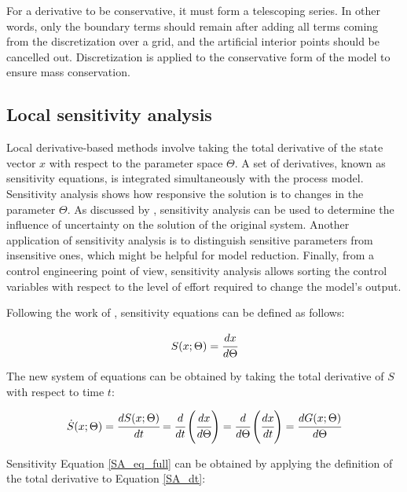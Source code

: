 \documentclass[a4paper,fleqn]{cas-dc}
\begin{document}
	For a derivative to be conservative, it must form a telescoping series. In other words, only the boundary terms should remain after adding all terms coming from the discretization over a grid, and the artificial interior points should be cancelled out. Discretization is applied to the conservative form of the model to ensure mass conservation.
	
	\subsection{Local sensitivity analysis} \label{CH: Sensitivity_Analysis}
	
	Local derivative-based methods involve taking the total derivative of the state vector $x$ with respect to the parameter space $\Theta$. A set of derivatives, known as sensitivity equations, is integrated simultaneously with the process model. Sensitivity analysis shows how responsive the solution is to changes in the parameter $\Theta$. As discussed by \citet{Dickinson1976}, sensitivity analysis can be used to determine the influence of uncertainty on the solution of the original system. Another application of sensitivity analysis is to distinguish sensitive parameters from insensitive ones, which might be helpful for model reduction. Finally, from a control engineering point of view, sensitivity analysis allows sorting the control variables with respect to the level of effort required to change the model's output.
	
	Following the work of \citet{Maly1996}, sensitivity equations can be defined as follows:
	
	{\footnotesize
		\begin{equation}
			\label{SA_def}
			S(x;\Theta) = \cfrac{dx}{d\Theta}
	\end{equation} }
	
	The new system of equations can be obtained by taking the total derivative of $S$ with respect to time $t$:
	
	{\footnotesize
		\begin{equation} \label{SA_dt} 
			{\dot{S}}(x;\Theta)  = \cfrac{dS(x;\Theta)}{d t} = \cfrac{d}{d t} \left( \cfrac{dx}{d\Theta} \right) = \cfrac{d }{d\Theta} \left( \cfrac{dx}{d t} \right) = \cfrac{d G(x;\Theta)}{d\Theta} 
	\end{equation} }
	
	Sensitivity Equation \ref{SA_eq_full} can be obtained by applying the definition of the total derivative to Equation \ref{SA_dt}:
	
\end{document}
